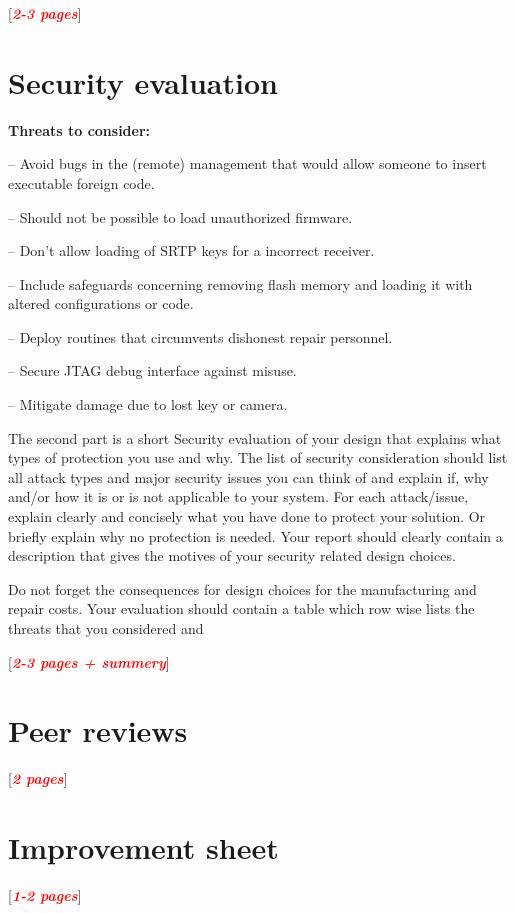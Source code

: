 \documentclass[10pt]{article}
\newcommand{\comm}[1]{{\itshape{{\leavevmode\color{gray}#1}}}}
\newcommand{\todo}[1]{
  \begin{center}
    [\textcolor{red}{\textbf{\textit{#1}}}]
  \end{center}
}
\newenvironment{checklist}{%
  \begin{list}{}{}%
  \let\olditem\item
  \renewcommand\item{\olditem -- \marginpar{$\Box$} }
  \newcommand\checkeditem{\olditem -- \marginpar{$\CheckedBox$} }
}{%
  \end{list}
}
\begin{document}
    \todo{2-3 pages}

  \section{Security evaluation}

  \textbf{Threats to consider:}
  \begin{checklist}
    \item{Avoid bugs in the (remote) management that would allow someone to
      insert executable foreign code.}
    \item{Should not be possible to load unauthorized firmware.}
    \item{Don't allow loading of SRTP keys for a incorrect receiver.}
    \item{Include safeguards concerning removing flash memory and loading it
      with altered configurations or code.}
    \item{Deploy routines that circumvents dishonest repair personnel.}
    \item{Secure JTAG debug interface against misuse.}
    \item{Mitigate damage due to lost key or camera.}
  \end{checklist}

  \comm{%
    The second part is a short Security evaluation of your design that explains
    what types of protection you use and why. The list of security
    consideration should list all attack types and major security issues you
    can think of and explain if, why and/or how it is or is not applicable to
    your system.  For each attack/issue, explain clearly and concisely what you
    have done to protect your solution.  Or briefly explain why no protection
    is needed. Your report should clearly contain a description that gives the
    motives of your security related design choices.

    Do not forget the consequences for design choices for the manufacturing and
    repair costs.  Your evaluation should contain a table which row wise lists
    the threats that you considered and
  }

    \todo{2-3 pages + summery}

  \section{Peer reviews}
    \todo{2 pages}

  \section{Improvement sheet}
    \todo{1-2 pages}
\end{document}
